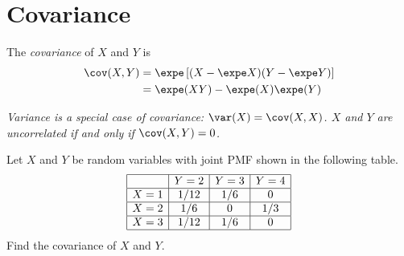 \section{Covariance}

\begin{definition}
The \emph{covariance} of $X$ and $Y$ is 
\begin{align*}
\cov(X,Y) 
	& = \expe\left[(X-\expe X)(Y-\expe Y)\right]  \\
	& = \expe(XY) - \expe(X)\expe(Y)
\end{align*}
\end{definition}

\begin{remark}
\ben
\it Variance is a special case of covariance: $\var(X) = \cov(X,X)$.
\it $X$ and $Y$ are uncorrelated if and only if $\cov(X,Y)=0$. 
\een
\end{remark}

\begin{example}
Let $X$ and $Y$ be random variables with joint PMF shown in the following table. 
\small
\[\begin{array}{|c|c|c|c|}\hline
	& Y=2	& Y=3	& Y=4	\\ \hline
X=1	& 1/12	& 1/6	& 0 		\\ \hline
X=2	& 1/6	& 0		& 1/3 	\\ \hline
X=3	& 1/12	& 1/6  	& 0		\\ \hline
\end{array}\]
\normalsize
Find the covariance of $X$ and $Y$.
\end{example}

